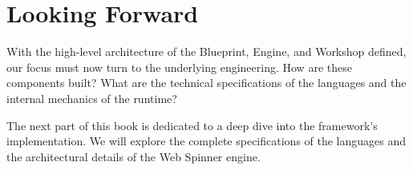 \section{Looking Forward}
\label{sec:architecture-forward}

With the high-level architecture of the Blueprint, Engine, and Workshop defined, our focus must now turn to the underlying engineering. How are these components built? What are the technical specifications of the languages and the internal mechanics of the runtime?

The next part of this book is dedicated to a deep dive into the framework's implementation. We will explore the complete specifications of the languages and the architectural details of the Web Spinner engine.

